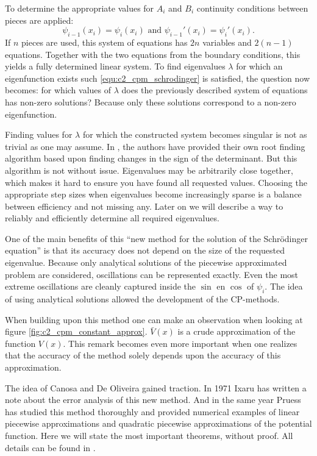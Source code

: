 To determine the appropriate values for $A_i$ and $B_i$ continuity conditions between pieces are applied:
$$
    \psi_{i-1}(x_i) = \psi_{i}(x_i) \text{ and } \psi_{i-1}'(x_i) = \psi_{i}'(x_i) \text{.}
$$
If $n$ pieces are used, this system of equations has $2n$ variables and $2(n-1)$ equations. Together with the two equations from the boundary conditions, this yields a fully determined linear system. To find eigenvalues $\lambda$ for which an eigenfunction exists such \eqref{equ:c2_cpm_schrodinger} is satisfied, the question now becomes: for which values of $\lambda$ does the previously described system of equations has non-zero solutions? Because only these solutions correspond to a non-zero eigenfunction.

Finding values for $\lambda$ for which the constructed system becomes singular is not as trivial as one may assume. In \cite{canosa_new_1970}, the authors have provided their own root finding algorithm based upon finding changes in the sign of the determinant. But this algorithm is not without issue. Eigenvalues may be arbitrarily close together, which makes it hard to ensure you have found all requested values. Choosing the appropriate step sizes when eigenvalues become increasingly sparse is a balance between efficiency and not missing any. Later on we will describe a way to reliably and efficiently determine all required eigenvalues.

One of the main benefits of this ``new method for the solution of the Schrödinger equation'' is that its accuracy does not depend on the size of the requested eigenvalue. Because only analytical solutions of the piecewise approximated problem are considered, oscillations can be represented exactly. Even the most extreme oscillations are cleanly captured inside the $\sin$ en $\cos$ of $\psi_i$. The idea of using analytical solutions allowed the development of the CP-methods.

When building upon this method one can make an observation when looking at figure \ref{fig:c2_cpm_constant_approx}. $\bar{V}(x)$ is a crude approximation of the function $V(x)$. This remark becomes even more important when one realizes that the accuracy of the method solely depends upon the accuracy of this approximation.

The idea of Canosa and De Oliveira gained traction. In 1971 Ixaru \cite{ixaru_error_1972} has written a note about the error analysis of this new method. And in the same year Pruess \cite{pruess_estimating_1973} has studied this method thoroughly and provided numerical examples of linear piecewise approximations and quadratic piecewise approximations of the potential function. Here we will state the most important theorems, without proof. All details can be found in \cite{pruess_estimating_1973}.

